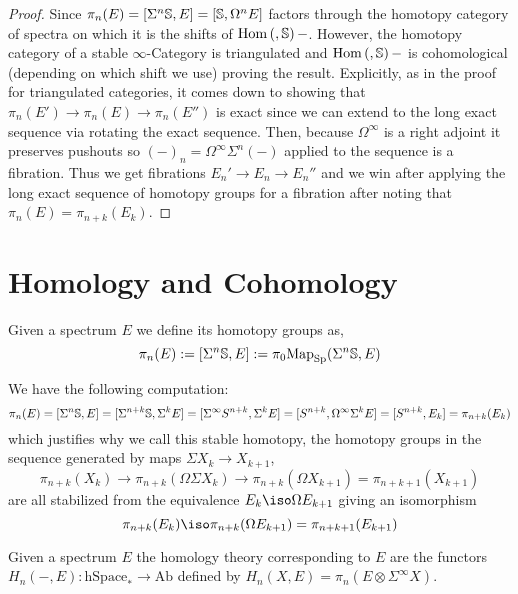\documentclass[12pt]{extarticle}
\begin{document}
\begin{proof}
Since $\pi_n(E) = [\Sigma^n \S, E] = [\S, \Omega^n E]$ factors through the homotopy category of spectra on which it is the shifts of $\Hom{}{\S}{-}$. However, the homotopy category of a stable $\infty$-Category is triangulated and $\Hom{}{\S}{-}$ is cohomological (depending on which shift we use) proving the result. Explicitly, as in the proof for triangulated categories, it comes down to showing that $\pi_n(E') \to \pi_n(E) \to \pi_n(E'')$ is exact since we can extend to the long exact sequence via rotating the exact sequence. Then, because $\Omega^\infty$ is a right adjoint it preserves pushouts so $(-)_n = \Omega^{\infty} \Sigma^n(-)$ applied to the sequence is a fibration. Thus we get fibrations $E_{n}' \to E_{n} \to E_{n}''$ and we win after applying the long exact sequence of homotopy groups for a fibration after noting that $\pi_n(E) = \pi_{n+k}(E_{k})$.
\end{proof}

\section{Homology and Cohomology}

\begin{defn}
Given a spectrum $E$ we define its homotopy groups as,
\[ \pi_n(E) := [\Sigma^n \S, E] := \pi_0 \mathrm{Map}_{\mathrm{Sp}}(\Sigma^n \S, E) \]
\end{defn}

\begin{rmk}
We have the following computation:
\[ \pi_n(E) = [\Sigma^n \S, E] = [\Sigma^{n+k} \S, \Sigma^k E] = [\Sigma^\infty S^{n+k}, \Sigma^k E] = [S^{n+k}, \Omega^\infty \Sigma^k E] = [S^{n+k}, E_k] = \pi_{n+k}(E_k) \]
which justifies why we call this stable homotopy, the homotopy groups in the sequence generated by maps $\Sigma X_k \to X_{k+1}$,
\[ \pi_{n+k}(X_k) \to \pi_{n+k}(\Omega \Sigma X_{k}) \to \pi_{n+k}(\Omega X_{k+1}) = \pi_{n+k+1}(X_{k+1}) \]
are all stabilized from the equivalence $E_{k} \iso \Omega E_{k+1}$ giving an isomorphism
\[ \pi_{n+k}(E_k) \iso \pi_{n+k}(\Omega E_{k+1}) = \pi_{n+k+1}(E_{k+1}) \]
\end{rmk}

\begin{defn}
Given a spectrum $E$ the homology theory corresponding to $E$ are the functors $H_n(-,E) : \mathrm{hSpace}_* \to \mathrm{Ab}$ defined by $H_n(X,E) = \pi_n(E \otimes \Sigma^\infty X)$.
\end{defn}
\end{document}
